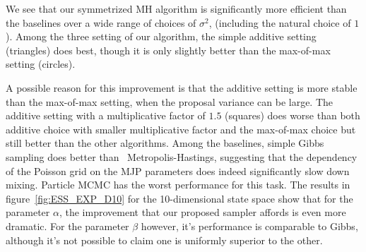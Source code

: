 We see that our symmetrized MH algorithm is significantly more efficient 
than the baselines over a wide range of choices of $\sigma^2$, 
(including the natural choice of $1$).
Among the three setting of our algorithm, the simple additive setting
 ({triangles}) does best, though it is only slightly better than 
 the {max-of-max} setting (circles). {A possible reason for this improvement is 
  that the additive setting is more stable than the max-of-max setting, when the 
proposal variance can be large. The {additive setting with a multiplicative factor 
of $1.5$} (squares) does worse than both {additive choice with smaller multiplicative
factor and the max-of-max choice} but still better than the other algorithms. Among 
the baselines, simple Gibbs sampling 
does better than \naive\ Metropolis-Hastings, suggesting that the dependency of 
the Poisson grid on the MJP parameters does indeed significantly slow 
down mixing. Particle MCMC has the worst performance for this task. The
results in figure~\ref{fig:ESS_EXP_D10} for the 10-dimensional state space
show that for the parameter $\alpha$, the improvement that our proposed
sampler affords is even more dramatic. For the parameter $\beta$ however,
it's performance is comparable to Gibbs, although it's not possible to
claim one is uniformly superior to the other.

}
